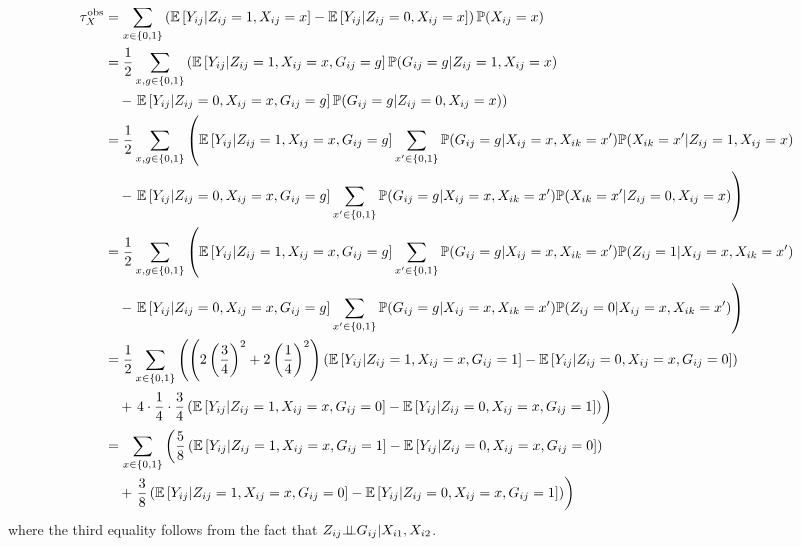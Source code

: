 \documentclass[10pt]{article}
\begin{document}
\iffalse
\begin{align*}
\tau_{X}^\text{obs} &= \sum_{x\in\{0,1\}}\left(\mathbb{E}\left[Y_{ij}|Z_{ij}=1,X_{ij}=x\right] - \mathbb{E}\left[Y_{ij}|Z_{ij}=0,X_{ij}=x\right]\right)\mathbb{P}(X_{ij}=x) \\
&= \frac{1}{2}\sum_{x,g\in\{0,1\}}\left(\mathbb{E}\left[Y_{ij}|Z_{ij}=1,X_{ij}=x,G_{ij}=g\right]\mathbb{P}(G_{ij}=g|Z_{ij}=1,X_{ij}=x)\right. \\
&\quad - \left.\mathbb{E}\left[Y_{ij}|Z_{ij}=0,X_{ij}=x,G_{ij}=g\right]\mathbb{P}(G_{ij}=g|Z_{ij}=0,X_{ij}=x)\right) \\
&= \frac{1}{2}\sum_{x,g\in\{0,1\}}\left(\mathbb{E}\left[Y_{ij}|Z_{ij}=1,X_{ij}=x,G_{ij}=g\right]\sum_{x'\in\{0,1\}}\mathbb{P}(G_{ij}=g|X_{ij}=x,X_{ik}=x')\mathbb{P}(X_{ik}=x'|Z_{ij}=1,X_{ij}=x)\right. \\
&\quad - \left.\mathbb{E}\left[Y_{ij}|Z_{ij}=0,X_{ij}=x,G_{ij}=g\right]\sum_{x'\in\{0,1\}}\mathbb{P}(G_{ij}=g|X_{ij}=x,X_{ik}=x')\mathbb{P}(X_{ik}=x'|Z_{ij}=0,X_{ij}=x)\right) \\
&= \frac{1}{2}\sum_{x,g\in\{0,1\}}\left(\mathbb{E}\left[Y_{ij}|Z_{ij}=1,X_{ij}=x,G_{ij}=g\right]\sum_{x'\in\{0,1\}}\mathbb{P}(G_{ij}=g|X_{ij}=x,X_{ik}=x')\mathbb{P}(Z_{ij}=1|X_{ij}=x,X_{ik}=x')\right. \\
&\quad - \left.\mathbb{E}\left[Y_{ij}|Z_{ij}=0,X_{ij}=x,G_{ij}=g\right]\sum_{x'\in\{0,1\}}\mathbb{P}(G_{ij}=g|X_{ij}=x,X_{ik}=x')\mathbb{P}(Z_{ij}=0|X_{ij}=x,X_{ik}=x')\right) \\
&= \frac{1}{2}\sum_{x\in\{0,1\}}\left(\left(2\left(\frac{3}{4}\right)^2+2\left(\frac{1}{4}\right)^2\right)\left(\mathbb{E}\left[Y_{ij}|Z_{ij}=1,X_{ij}=x,G_{ij}=1\right]-\mathbb{E}\left[Y_{ij}|Z_{ij}=0,X_{ij}=x,G_{ij}=0\right]\right) \right. \\
&\quad +\left. 4\cdot\frac{1}{4}\cdot\frac{3}{4}\left(\mathbb{E}\left[Y_{ij}|Z_{ij}=1,X_{ij}=x,G_{ij}=0\right]-\mathbb{E}\left[Y_{ij}|Z_{ij}=0,X_{ij}=x,G_{ij}=1\right]\right) \right) \\
&= \sum_{x\in\{0,1\}}\left(\frac{5}{8}\left(\mathbb{E}\left[Y_{ij}|Z_{ij}=1,X_{ij}=x,G_{ij}=1\right]-\mathbb{E}\left[Y_{ij}|Z_{ij}=0,X_{ij}=x,G_{ij}=0\right]\right) \right. \\
&\quad +\left. \frac{3}{8}\left(\mathbb{E}\left[Y_{ij}|Z_{ij}=1,X_{ij}=x,G_{ij}=0\right]-\mathbb{E}\left[Y_{ij}|Z_{ij}=0,X_{ij}=x,G_{ij}=1\right]\right) \right)
\end{align*}
where the third equality follows from the fact that $Z_{ij}{\perp\!\!\!\perp} G_{ij}|X_{i1},X_{i2}$.
\end{document}

